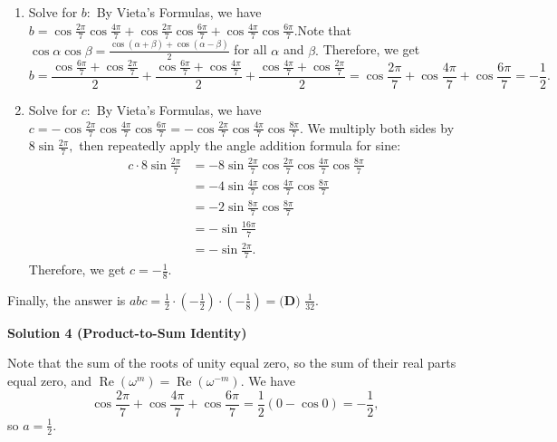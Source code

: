 \begin{enumerate}
\begin{enumerate}
 Note that $\cos\theta=\cos(2\pi-\theta)$ for all $\theta.$ Excluding $1,$ the other six roots add to 
 \[2\left(\cos \frac{2\pi}7 + \cos \frac{4\pi}7 + \cos \frac{6\pi}7\right) = -1,\] from which 
 \[\cos \frac{2\pi}7 + \cos \frac{4\pi}7 + \cos \frac{6\pi}7 = -\frac12.\]Therefore, we get $a = -\left(-\frac12\right) = \frac12.$


        \item Solve for $b:$ By Vieta's Formulas, we have $b = \cos \frac{2\pi}7 \cos \frac{4\pi}7 + \cos \frac{2\pi}7 \cos \frac{6\pi}7 + \cos \frac{4\pi}7 \cos \frac{6\pi}7.$Note that $\cos \alpha \cos \beta = \frac{ \cos \left(\alpha + \beta\right) + \cos \left(\alpha - \beta\right) }{2}$ for all $\alpha$ and $\beta.$ Therefore, we get 
 \[b=\frac{\cos \frac{6\pi}7 + \cos \frac{2\pi}7}2 + \frac{\cos \frac{6\pi}7 + \cos \frac{4\pi}7}2 + \frac{\cos \frac{4\pi}7 + \cos \frac{2\pi}7}2=\cos \frac{2\pi}7 + \cos \frac{4\pi}7 + \cos \frac{6\pi}7=-\frac12.\]
 
        \item Solve for $c:$ By Vieta's Formulas, we have $c = -\cos \frac{2\pi}7 \cos \frac{4\pi}7 \cos \frac{6\pi}7=-\cos \frac{2\pi}7 \cos \frac{4\pi}7 \cos \frac{8\pi}7.$ We multiply both sides by $8 \sin{\frac{2\pi}{7}},$ then repeatedly apply the angle addition formula for sine:
 \begin{align*} c \cdot 8 \sin{\frac{2\pi}{7}} &= -8 \sin{\frac{2\pi}{7}} \cos \frac{2\pi}7 \cos \frac{4\pi}7 \cos \frac{8\pi}7 \\ &= -4 \sin \frac{4\pi}7 \cos \frac{4\pi}7 \cos \frac{8\pi}7 \\ &= -2 \sin \frac{8\pi}7 \cos \frac{8\pi}7 \\ &= -\sin \frac{16\pi}7 \\ &= -\sin \frac{2\pi}7. \end{align*}
Therefore, we get $c = -\frac18.$

            \end{enumerate}
            Finally, the answer is $abc=\frac12\cdot\left(-\frac12\right)\cdot\left(-\frac18\right)=\boxed{\textbf{(D) }\frac{1}{32}}.$




\textbf{Solution 4 (Product-to-Sum Identity)}

Note that the sum of the roots of unity equal zero, so the sum of their real parts equal zero, and $\operatorname{Re}\left(\omega^{m}\right) = \operatorname{Re}\left(\omega^{-m}\right).$ We have 
 \[\cos \frac{2 \pi}{7} + \cos \frac{4 \pi}{7} + \cos \frac{6 \pi}{7} = \frac12(0 - \cos 0) = -\frac12,\] so $a = \frac{1}{2}.$


\end{enumerate}

